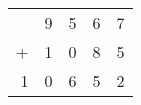 \begin{tabular}{rrrrr}
& 9 & 5 & 6 & 7 \\
+ & 1 & 0 & 8 & 5 \\ \hline
1 & 0 & 6 & 5 & 2
\end{tabular}
